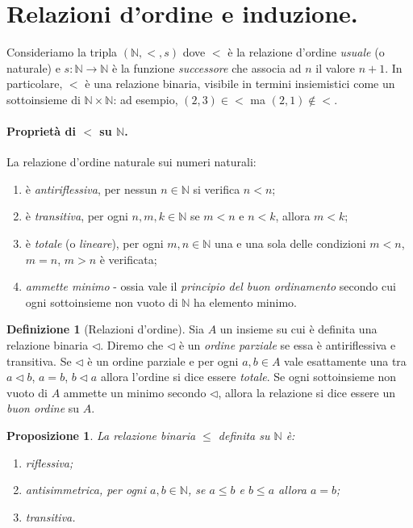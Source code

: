\documentclass[fontsize = 11 pt, paper=A4, oneside, index=totoc, hyperref]{article}
\theoremstyle{definition}
\newtheorem{dfn}{Definizione}[section]
\theoremstyle{plain}
\newtheorem{prp}{Proposizione}[section]
\newcommand{\N}{\mathbb{N}}
\begin{document}
\tableofcontents

\section{Relazioni d'ordine e induzione.}

Consideriamo la tripla \(\left(\N, <, s \right)\) dove \(<\) è la relazione d'ordine \emph{usuale} (o naturale) e \(s \colon \N \to \N\) è la funzione \emph{successore} che associa ad \(n\) il valore \(n+1\). In particolare, \(<\) è una relazione binaria, visibile in termini insiemistici come un sottoinsieme di \(\N \times \N\): ad esempio, \((2,3) \in <\) ma \((2,1) \notin <\).

\paragraph{Proprietà di \(<\) su \(\N\).} La relazione d'ordine naturale sui numeri naturali:
\begin{enumerate}
  \item è \emph{antiriflessiva}, per nessun \(n \in \N\) si verifica \(n < n\);
  \item è \emph{transitiva}, per ogni \(n, m, k \in \N\) se \(m < n\) e \(n < k\), allora \(m < k\);
  \item è \emph{totale} (o \emph{lineare}), per ogni \(m,n \in \N\) una e una sola delle condizioni \(m < n\), \(m = n\), \(m > n\) è verificata;
  \item \emph{ammette minimo} - ossia vale il \emph{principio del buon ordinamento} secondo cui ogni sottoinsieme non vuoto di \(\N\) ha elemento minimo.
\end{enumerate}

\begin{dfn}[Relazioni d'ordine] Sia \(A\) un insieme su cui è definita una relazione binaria \(\lhd\). Diremo che \(\lhd\) è un \emph{ordine parziale} se essa è antiriflessiva e transitiva. Se \(\lhd\) è un ordine parziale e per ogni \(a,b \in A\) vale esattamente una tra \(a \lhd b\), \(a = b\), \(b \lhd a\) allora l'ordine si dice essere \emph{totale}. Se ogni sottoinsieme non vuoto di \(A\) ammette un minimo secondo \(\lhd\), allora la relazione si dice essere un \emph{buon ordine} su \(A\).
\end{dfn}

\begin{prp} La relazione binaria \(\le\) definita su \(\N\) è:
  \begin{enumerate}
    \item \emph{riflessiva};
    \item \emph{antisimmetrica}, per ogni \(a, b \in \N\), se \(a \le b\) e \(b \le a\) allora \(a = b\);
    \item \emph{transitiva}.
  \end{enumerate}
\end{prp}
\end{document}
